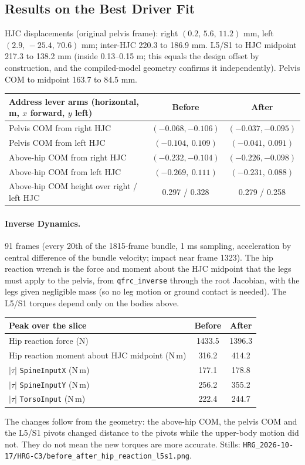 \subsection{Results on the Best Driver Fit}
HJC displacements (original pelvis frame): right $(0.2,\,5.6,\,11.2)$ mm, left
$(2.9,\,-25.4,\,70.6)$ mm; inter-HJC 220.3 to 186.9 mm. L5/S1 to HJC midpoint 217.3 to
138.2 mm (inside 0.13--0.15 m; this equals the design offset by construction, and the
compiled-model geometry confirms it independently). Pelvis COM to midpoint 163.7 to
84.5 mm.

\begin{center}
\begin{tabular}{lcc}
\hline
Address lever arms (horizontal, m, $x$ forward, $y$ left) & Before & After \\
\hline
Pelvis COM from right HJC & $(-0.068,-0.106)$ & $(-0.037,-0.095)$ \\
Pelvis COM from left HJC & $(-0.104,\ 0.109)$ & $(-0.041,\ 0.091)$ \\
Above-hip COM from right HJC & $(-0.232,-0.104)$ & $(-0.226,-0.098)$ \\
Above-hip COM from left HJC & $(-0.269,\ 0.111)$ & $(-0.231,\ 0.088)$ \\
Above-hip COM height over right / left HJC & 0.297 / 0.328 & 0.279 / 0.258 \\
\hline
\end{tabular}
\end{center}

\paragraph{Inverse Dynamics.} 91 frames (every 20th of the 1815-frame bundle, 1 ms
sampling, acceleration by central difference of the bundle velocity; impact near frame
1323). The hip reaction wrench is the force and moment about the HJC midpoint that the
legs must apply to the pelvis, from \texttt{qfrc\_inverse} through the root Jacobian,
with the legs given negligible mass (so no leg motion or ground contact is needed). The
L5/S1 torques depend only on the bodies above.
\begin{center}
\begin{tabular}{lcc}
\hline
Peak over the slice & Before & After \\
\hline
Hip reaction force (N) & 1433.5 & 1396.3 \\
Hip reaction moment about HJC midpoint (N\,m) & 316.2 & 414.2 \\
$|\tau|$ \texttt{SpineInputX} (N\,m) & 177.1 & 178.8 \\
$|\tau|$ \texttt{SpineInputY} (N\,m) & 256.2 & 355.2 \\
$|\tau|$ \texttt{TorsoInput} (N\,m) & 222.4 & 244.7 \\
\hline
\end{tabular}
\end{center}
The changes follow from the geometry: the above-hip COM, the pelvis COM and the L5/S1
pivots changed distance to the pivots while the upper-body motion did not. They do not
mean the new torques are more accurate. Stills:
\texttt{HRG\_2026-10-17/HRG-C3/before\_after\_hip\_reaction\_l5s1.png}.

